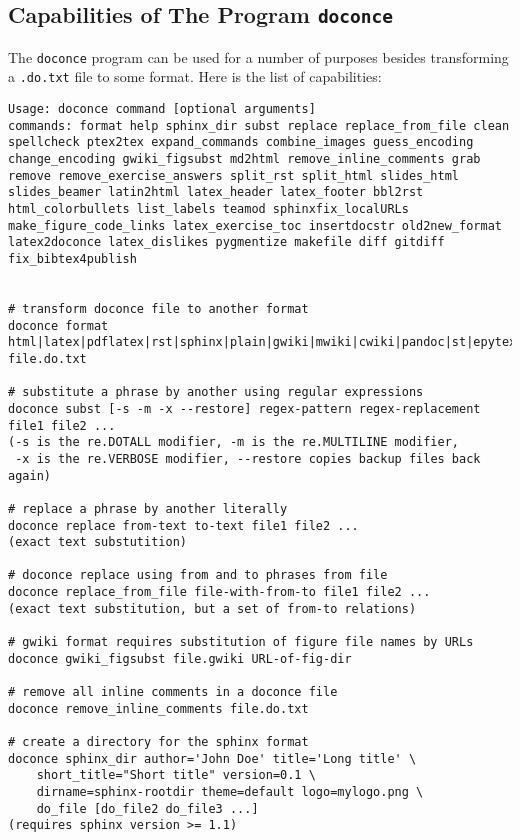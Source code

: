 \documentclass[%
oneside,                 %
final,                   %
10pt]{article}
\begin{document}
\subsection{Capabilities of The Program \protect\Verb!doconce! }

The \Verb!doconce! program can be used for a number of purposes besides
transforming a \Verb!.do.txt! file to some format. Here is the
list of capabilities:

\begin{Verbatim}[numbers=none,fontsize=\fontsize{9pt}{9pt},baselinestretch=0.85,xleftmargin=0mm]
Usage: doconce command [optional arguments]
commands: format help sphinx_dir subst replace replace_from_file clean spellcheck ptex2tex expand_commands combine_images guess_encoding change_encoding gwiki_figsubst md2html remove_inline_comments grab remove remove_exercise_answers split_rst split_html slides_html slides_beamer latin2html latex_header latex_footer bbl2rst html_colorbullets list_labels teamod sphinxfix_localURLs make_figure_code_links latex_exercise_toc insertdocstr old2new_format latex2doconce latex_dislikes pygmentize makefile diff gitdiff fix_bibtex4publish


# transform doconce file to another format
doconce format html|latex|pdflatex|rst|sphinx|plain|gwiki|mwiki|cwiki|pandoc|st|epytext file.do.txt

# substitute a phrase by another using regular expressions
doconce subst [-s -m -x --restore] regex-pattern regex-replacement file1 file2 ...
(-s is the re.DOTALL modifier, -m is the re.MULTILINE modifier,
 -x is the re.VERBOSE modifier, --restore copies backup files back again)

# replace a phrase by another literally
doconce replace from-text to-text file1 file2 ...
(exact text substutition)

# doconce replace using from and to phrases from file
doconce replace_from_file file-with-from-to file1 file2 ...
(exact text substitution, but a set of from-to relations)

# gwiki format requires substitution of figure file names by URLs
doconce gwiki_figsubst file.gwiki URL-of-fig-dir

# remove all inline comments in a doconce file
doconce remove_inline_comments file.do.txt

# create a directory for the sphinx format
doconce sphinx_dir author='John Doe' title='Long title' \
    short_title="Short title" version=0.1 \
    dirname=sphinx-rootdir theme=default logo=mylogo.png \
    do_file [do_file2 do_file3 ...]
(requires sphinx version >= 1.1)


\end{Verbatim}
\end{document}
